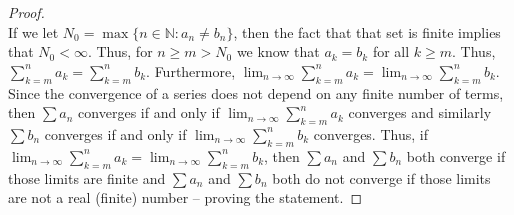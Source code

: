 \documentclass[10pt,a4paper]{article}
\theoremstyle{definition}
\begin{document}
\begin{proof}{$ $}
\\If we let $N_0 = \max\{n \in \mathbb{N} : a_n \neq b_n\}$, then the fact that that set is finite implies that $N_0 < \infty$. Thus, for $n \geq m > N_0$ we know that $a_k = b_k$ for all $k \geq m$. Thus, $\displaystyle \sum_{k = m}^n a_k = \sum_{k = m}^n b_k$. Furthermore, $\displaystyle \lim_{n \to \infty} \sum_{k = m}^n a_k = \lim_{n \to \infty} \sum_{k = m}^n b_k$. Since the convergence of a series does not depend on any finite number of terms, then $\displaystyle \sum a_n$ converges if and only if $\displaystyle \lim_{n \to \infty} \sum_{k = m}^n a_k$ converges and similarly $\displaystyle \sum b_n$ converges if and only if $\displaystyle \lim_{n \to \infty} \sum_{k = m}^n b_k$ converges. Thus, if $\displaystyle \lim_{n \to \infty} \sum_{k = m}^n a_k = \lim_{n \to \infty} \sum_{k = m}^n b_k$, then $\sum a_n$ and $\sum b_n$ both converge if those limits are finite and $\sum a_n$ and $\sum b_n$ both do not converge if those limits are not a real (finite) number -- proving the statement.
\end{proof}
\end{document}

